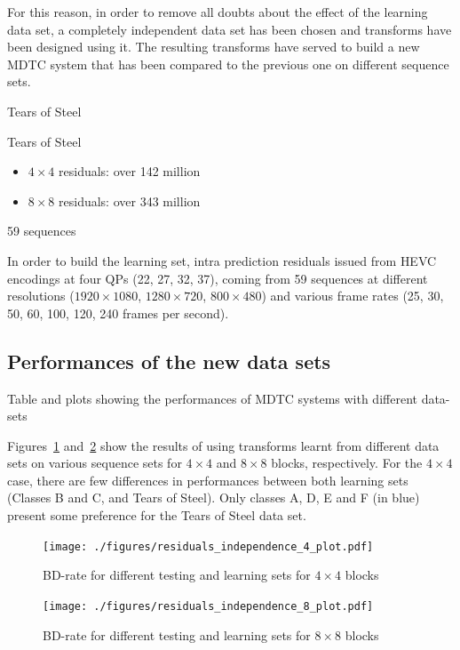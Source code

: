 \documentclass[11pt,a4paper,openright,twoside]{book}
\numberwithin{equation}{section} %
\numberwithin{figure}{section} %
\numberwithin{table}{section} %
\begin{document}
For this reason, in order to remove all doubts about the effect of the
learning data set, a completely independent data set has been chosen and
transforms have been designed using it.
The resulting transforms have served to build a new \ac{MDTC} system that has
been compared to the previous one on different sequence sets.

Tears of Steel

Tears of Steel
\begin{itemize}
	\item $4\times4$ residuals: over 142 million
	\item $8\times8$ residuals: over 343 million
\end{itemize}

59 sequences

In order to build the learning set, intra prediction residuals issued from
\ac{HEVC} encodings at four \acp{QP} (22, 27, 32, 37), coming from 59
sequences at different resolutions ($1920\times1080$, $1280\times720$,
$800\times480$) and various frame rates (25, 30, 50, 60, 100, 120, 240
frames per second).

\subsection{Performances of the new data sets}
\label{sub:rw_performances_new_data_set}

Table and plots showing the performances of MDTC systems with different data-sets

Figures~\ref{fig:residuals_independence_4}
and~\ref{fig:residuals_independence_8} show the results of using transforms
learnt from different data sets on various sequence sets for $4\times4$ and
$8\times8$ blocks, respectively.
For the $4\times4$ case, there are few differences in performances between
both learning sets (Classes B and C, and Tears of Steel).
Only classes A, D, E and F (in blue) present some preference for the Tears of
Steel data set.

\begin{figure}[tb]
	\centering
	\texttt{[image: ./figures/residuals\_independence\_4\_plot.pdf]}
	\caption{\acs{BD}-rate for different testing and learning sets for
	$4\times4$ blocks}
	\label{fig:residuals_independence_4}
\end{figure}

\begin{figure}[tb]
	\centering
	\texttt{[image: ./figures/residuals\_independence\_8\_plot.pdf]}
	\caption{\acs{BD}-rate for different testing and learning sets for
	$8\times8$ blocks}
	\label{fig:residuals_independence_8}
\end{figure}
\end{document}
